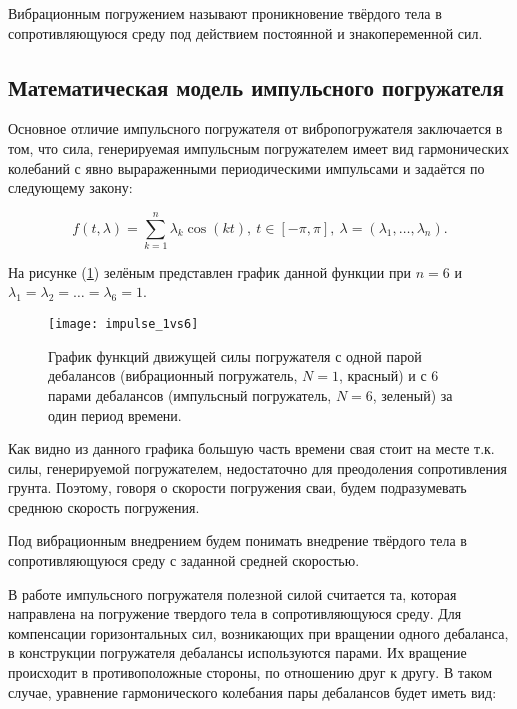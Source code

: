 \begin{definition}
    Вибрационным погружением называют проникновение твёрдого тела в сопротивляющуюся среду
    под действием постоянной и знакопеременной сил.
\end{definition}

\subsection{Математическая модель импульсного погружателя}

Основное отличие импульсного погружателя от вибропогружателя заключается в том, что сила, генерируемая
импульсным погружателем имеет вид гармонических колебаний с явно вырараженными периодическими импульсами и задаётся
по следующему закону:

\begin{equation}
    f(t,\lambda)=\sum_{k=1}^n \lambda_k\cos(kt),\ t\in [-\pi,\pi],\ \lambda =(\lambda_1, \ldots,\lambda_n).
\end{equation}

\noindent На рисунке (\ref{fig:impulse_1vs6}) зелёным представлен график данной функции при $n = 6$ и
$\lambda_1 = \lambda_2 = \ldots = \lambda_6 = 1$.

\begin{figure}[ht]
    \centering
    \texttt{[image: impulse\_1vs6]}
    \caption{График функций движущей силы погружателя с одной парой дебалансов (вибрационный погружатель, $N = 1$, красный) и с 6 парами дебалансов (импульсный погружатель, $N = 6$, зеленый) за один период времени.}
    \label{fig:impulse_1vs6}
\end{figure}

\noindent Как видно из данного графика большую часть времени свая стоит на месте т.к. силы, генерируемой погружателем,
недостаточно для преодоления сопротивления грунта. Поэтому, говоря о скорости погружения сваи, будем подразумевать среднюю
скорость погружения.

\begin{definition}
    Под вибрационным внедрением будем понимать внедрение твёрдого тела в сопротивляющуюся среду с заданной
    средней скоростью.
\end{definition}

В работе импульсного погружателя полезной силой считается та, которая направлена на погружение твердого тела в
сопротивляющуюся среду. Для компенсации горизонтальных сил, возникающих при вращении одного дебаланса,
в конструкции погружателя дебалансы используются парами. Их вращение происходит в противоположные стороны, по отношению друг
к другу. В таком случае, уравнение гармонического колебания пары дебалансов будет иметь вид:


